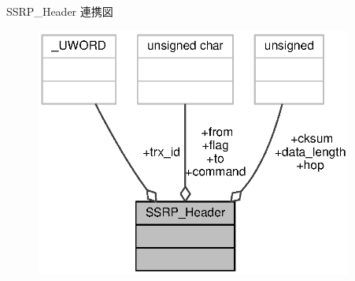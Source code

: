 S\+S\+R\+P\+\_\+\+Header 連携図
\nopagebreak
\begin{figure}[H]
\begin{center}
\leavevmode
\includegraphics[width=296pt]{de/d39/structSSRP__Header__coll__graph}
\end{center}
\end{figure}
